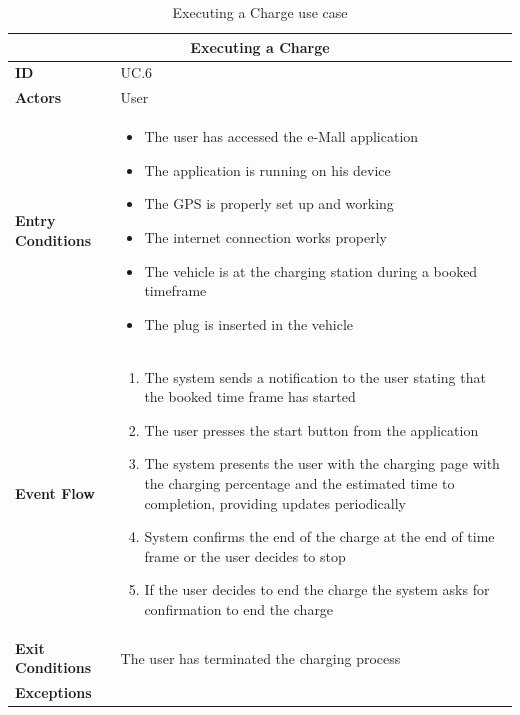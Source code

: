\documentclass[12pt]{report}
\begin{document}
    \clearpage
    \begin{table}[h]
        \centering
        \begin{tabular}{ |p{4cm}|p{11cm}|  }
        \hline
        \multicolumn{2}{|c|}{\textbf{Executing a Charge}} \\
        \hline
            \textbf{ID} &  UC.6\\
        \hline
            \textbf{Actors} & User\\
        \hline
            \textbf{Entry Conditions} &
                \begin{itemize}
                    \item The user has accessed the e-Mall application
                    \item The application is running on his device
                    \item The GPS is properly set up and working
                    \item The internet connection works properly
                    \item The vehicle is at the charging station during a booked timeframe
                    \item The plug is inserted in the vehicle
                \end{itemize}\\
        \hline
            \textbf{Event Flow} &
                \begin{enumerate}
                    \item The system sends a notification to the user stating that the booked time frame has started
                    \item The user presses the start button from the application
                    \item The system presents the user with the charging page with the charging percentage and the estimated time to completion, providing updates periodically
                    \item System confirms the end of the charge at the end of time frame or the user decides to stop
                    \item If the user decides to end the charge the system asks for confirmation to end the charge
                \end{enumerate}\\
        \hline
            \textbf{Exit Conditions} & The user has terminated the charging process\\
        \hline
            \textbf{Exceptions} & \\
        \hline
        \end{tabular}
        \caption{\label{demo-table}Executing a Charge use case}
    \end{table}
    \clearpage
    
\end{document}
